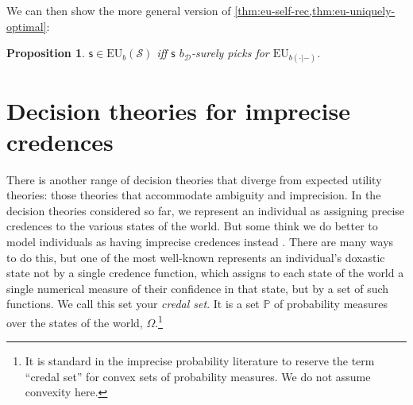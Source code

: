 \documentclass[a4paper]{article}
\newtheorem{proposition}[theorem]{Proposition}
\renewcommand\P{\mathbb{P}} %
\newcommand\EU{\mathrm{EU}}
\newcommand{\Decs}{\mathcal{D}}
\renewcommand\S{\mathcal{S}}
\newcommand\s{\mathsf{s}}
\newcommand{\IP}{\P}
\newcommand{\todoold}[2][]{\todo[backgroundcolor=white,bordercolor=orange!10,linecolor=gray!10, #1,caption={},textcolor=gray]{Pre-rev: #2}}
\newcommand{\todooldinfo}[2][]{\todoold[#1]{#2}}
\newcommand{\Strategies}{\S}
\newenvironment{CCM rewritten}
{\begingroup\color{blue}} %
{\endgroup}              %
\begin{document}
We can then show the more general version of \cref{thm:eu-self-rec,thm:eu-uniquely-optimal}:
\begin{proposition}\label{thm:eu-dep}
	$\s\in\EU_b(\Strategies)$ iff $\s$ $b_\Decs$-surely picks for $\EU_{b(\cdot|-)}$.
\end{proposition}








\section{Decision theories for imprecise credences}

There is another range of decision theories that diverge from expected utility theories: those theories that accommodate ambiguity and imprecision. In the decision theories considered so far, we represent an individual as assigning precise credences to the various states of the world. But some think we do better to model individuals as having imprecise credences instead \citep{walley1991srip, bradley2016ip}. There are many ways to do this, but one of the most well-known represents an individual's doxastic state not by a single credence function, which assigns to each state of the world a single numerical measure of their confidence in that state, but by a set of such functions. We call this set your \emph{credal set}. It is a set $\IP$ of probability measures over the states of the world, $\Omega$.\footnote{{It is standard in the imprecise probability literature to reserve the term ``credal set'' for convex sets of probability measures. We do not assume convexity here.}}
\end{document}
